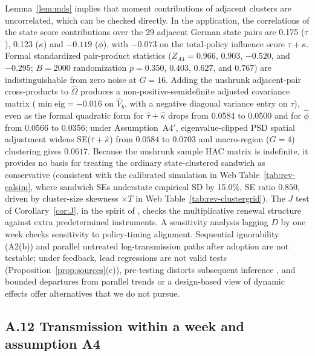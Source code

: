 \begin{remark}[Testability]
\label{rem:testable}
Lemma~\ref{lem:mds} implies that moment contributions of adjacent clusters are uncorrelated,
which can be checked directly. In the application, the correlations of the state score
contributions over the 29 adjacent German state pairs are 0.175 ($\tau$), 0.123 ($\kappa$) and $-0.119$
($\phi$), with $-0.073$ on the total-policy influence score $\tau+\kappa$. Formal standardized
pair-product statistics ($Z_{A4}=0.966$, $0.903$, $-0.520$, and $-0.295$; $B=2000$ randomization
$p=0.350$, $0.403$, $0.627$, and $0.767$) are indistinguishable from zero noise at $G=16$. Adding the
unshrunk adjacent-pair cross-products to $\hat\Omega$ produces a non-positive-semidefinite
adjusted covariance matrix ($\min\mathrm{eig}=-0.016$ on $\hat V_b$, with a negative diagonal
variance entry on $\tau$), even as the formal quadratic form for $\hat\tau+\hat\kappa$ drops from
0.0584 to 0.0500 and for $\hat\phi$ from 0.0566 to 0.0356; under Assumption~A4$'$, eigenvalue-clipped
PSD spatial adjustment widens SE($\hat\tau+\hat\kappa$) from $0.0584$ to $0.0703$ and
macro-region ($G=4$) clustering gives $0.0617$. Because the unshrunk sample HAC matrix is indefinite,
it provides no basis for treating the ordinary state-clustered sandwich as conservative (consistent
with the calibrated simulation in Web Table~\ref{tab:rev-calsim}, where sandwich SEs understate
empirical SD by 15.0\%, SE ratio $0.850$, driven by cluster-size skewness $\times T$ in Web
Table~\ref{tab:rev-clustergrid}). The
$J$ test of Corollary~\ref{cor:J}, in the spirit of \citet{arellano1991tests}, checks the
multiplicative renewal structure against extra predetermined instruments. A sensitivity analysis
lagging $D$ by one week checks sensitivity to policy-timing alignment. Sequential ignorability
(A2(b)) and parallel untreated log-transmission paths after adoption are not testable; under
feedback, lead regressions are not valid tests (Proposition~\ref{prop:sources}(c)), pre-testing
distorts subsequent inference \citep{roth2022pretest}, and bounded departures from parallel trends
\citep{rambachan2023credible} or a design-based view of dynamic effects \citep{bojinov2021panel}
offer alternatives that we do not pursue.
\end{remark}

\subsection{A.12 Transmission within a week and assumption A4}
\label{ss:weekwithin}

